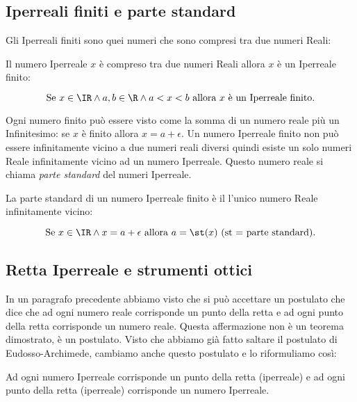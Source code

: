 \subsection{Iperreali finiti e parte standard}
\label{subsec:insnum_partestandard}

Gli Iperreali finiti sono quei numeri che sono compresi tra due numeri Reali:

\begin{definizione}
 Il numero Iperreale $x$ è compreso tra due numeri Reali allora $x$ è un 
Iperreale finito:

\[\text{Se } x \in \IR \wedge a, b \in \R \wedge 
  a < x < b \text{ allora } x \text{ è un Iperreale finito.}\]
\end{definizione}

Ogni numero finito può essere visto come la somma di un numero reale più un 
Infinitesimo: se $x$ è finito allora $x = a + \epsilon$. Un numero Iperreale 
finito non può essere infinitamente vicino a due numeri reali diversi quindi 
esiste un solo numeri Reale infinitamente vicino ad un numero Iperreale. 
Questo numero reale si chiama \emph{parte standard} del numeri Iperreale.

\begin{definizione}
 La parte standard di un numero Iperreale finito è il l'unico numero Reale 
infinitamente vicino:

\[\text{Se } x \in \IR \wedge x= a+\epsilon \text{ allora } 
a= \st(x) \text{ (st = parte standard).}\]
\end{definizione}


\subsection{Retta Iperreale e strumenti ottici}
\label{subsec:insnum_retta}

In un paragrafo precedente abbiamo visto che si può accettare un postulato che 
dice che ad ogni numero reale corrisponde un punto della retta e ad ogni 
punto della retta corrisponde un numero reale. 
Questa affermazione non è un teorema dimostrato, è un postulato. Visto che 
abbiamo già fatto saltare il postulato di Eudosso-Archimede, cambiamo anche 
questo postulato e lo riformuliamo così:

\begin{postulato}
Ad ogni numero Iperreale corrisponde un punto della retta (iperreale) e ad ogni 
punto della retta (iperreale) corrisponde un numero Iperreale.
\end{postulato}

